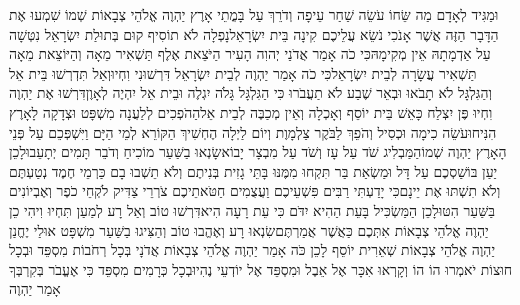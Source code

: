 \documentclass[../main/main.tex]{subfiles}
\begin{document}
\begin{multicols}{\ncols}
וּמַגִּיד לְאָדָם מַה שֵּׂחוֹ עֹשֵׂה שַׁחַר עֵיפָה וְדֹרֵךְ עַל בָּמֳתֵי אָרֶץ יַהְוֶה אֱלֹהֵי צְבָאוֹת שְׁמוֹ \ClosedSection{}שִׁמְעוּ אֶת הַדָּבָר הַזֶּה אֲשֶׁר אָנֹכִי נֹשֵׂא עֲלֵיכֶם קִינָה בֵּית יִשְׂרָאֵל\PreVerseSpace{}נָפְלָה לֹא תוֹסִיף קוּם בְּתוּלַת יִשְׂרָאֵל נִטְּשָׁה עַל אַדְמָתָהּ אֵין מְקִימָהּ\PreVerseSpace{}כִּי כֹה אָמַר אֲדֹנַי יְהוִה הָעִיר הַיֹּצֵאת אֶלֶף תַּשְׁאִיר מֵאָה וְהַיּוֹצֵאת מֵאָה תַּשְׁאִיר עֲשָׂרָה לְבֵית יִשְׂרָאֵל\PreVerseSpace{}כִּי כֹה אָמַר יַהְוֶה לְבֵית יִשְׂרָאֵל דִּרְשׁוּנִי וִחְיוּ\PreVerseSpace{}וְאַל תִּדְרְשׁוּ בֵּית אֵל וְהַגִּלְגָּל לֹא תָבֹאוּ וּבְאֵר שֶׁבַע לֹא תַעֲבֹרוּ כִּי הַגִּלְגָּל גָּלֹה יִגְלֶה וּבֵית אֵל יִהְיֶה לְאָוֶן\PreVerseSpace{}דִּרְשׁוּ אֶת יַהְוֶה וִחְיוּ פֶּן יִצְלַח כָּאֵשׁ בֵּית יוֹסֵף וְאָכְלָה וְאֵין מְכַבֶּה לְבֵית אֵל\PreVerseSpace{}הַהֹפְכִים לְלַעֲנָה מִשְׁפָּט וּצְדָקָה לָאָרֶץ הִנִּיחוּ\PreVerseSpace{}עֹשֵׂה כִימָה וּכְסִיל וְהֹפֵךְ לַבֹּקֶר צַלְמָוֶת וְיוֹם לַיְלָה הֶחְשִׁיךְ הַקּוֹרֵא לְמֵי הַיָּם וַיִּשְׁפְּכֵם עַל פְּנֵי הָאָרֶץ יַהְוֶה שְׁמוֹ\PreVerseSpace{}הַמַּבְלִיג שֹׁד עַל עָז וְשֹׁד עַל מִבְצָר יָבוֹא\PreVerseSpace{}שָׂנְאוּ בַשַּׁעַר מוֹכִיחַ וְדֹבֵר תָּמִים יְתָעֵבוּ\PreVerseSpace{}לָכֵן יַעַן בּוֹשַׁסְכֶם עַל דָּל וּמַשְׂאַת בַּר תִּקְחוּ מִמֶּנּוּ בָּתֵּי גָזִית בְּנִיתֶם וְלֹא תֵשְׁבוּ בָם כַּרְמֵי חֶמֶד נְטַעְתֶּם וְלֹא תִשְׁתּוּ אֶת יֵינָם\PreVerseSpace{}כִּי יָדַעְתִּי רַבִּים פִּשְׁעֵיכֶם וַעֲצֻמִים חַטֹּאתֵיכֶם צֹרְרֵי צַדִּיק לֹקְחֵי כֹפֶר וְאֶבְיוֹנִים בַּשַּׁעַר הִטּוּ\PreVerseSpace{}לָכֵן הַמַּשְׂכִּיל בָּעֵת הַהִיא יִדֹּם כִּי עֵת רָעָה הִיא\PreVerseSpace{}דִּרְשׁוּ טוֹב וְאַל רָע לְמַעַן תִּחְיוּ וִיהִי כֵן יַהְוֶה אֱלֹהֵי צְבָאוֹת אִתְּכֶם כַּאֲשֶׁר אֲמַרְתֶּם\PreVerseSpace{}שִׂנְאוּ רָע וְאֶהֱבוּ טוֹב וְהַצִּיגוּ בַשַּׁעַר מִשְׁפָּט אוּלַי יֶחֱנַן יַהְוֶה אֱלֹהֵי צְבָאוֹת שְׁאֵרִית יוֹסֵף \ClosedSection{}לָכֵן כֹּה אָמַר יַהְוֶה אֱלֹהֵי צְבָאוֹת אֲדֹנָי בְּכָל רְחֹבוֹת מִסְפֵּד וּבְכָל חוּצוֹת יֹאמְרוּ הוֹ הוֹ וְקָרְאוּ אִכָּר אֶל אֵבֶל וּמִסְפֵּד אֶל יוֹדְעֵי נֶהִי\PreVerseSpace{}וּבְכָל כְּרָמִים מִסְפֵּד כִּי אֶעֱבֹר בְּקִרְבְּךָ אָמַר יַהְוֶה\OpenSection{}\par

\end{multicols}
\end{document}
